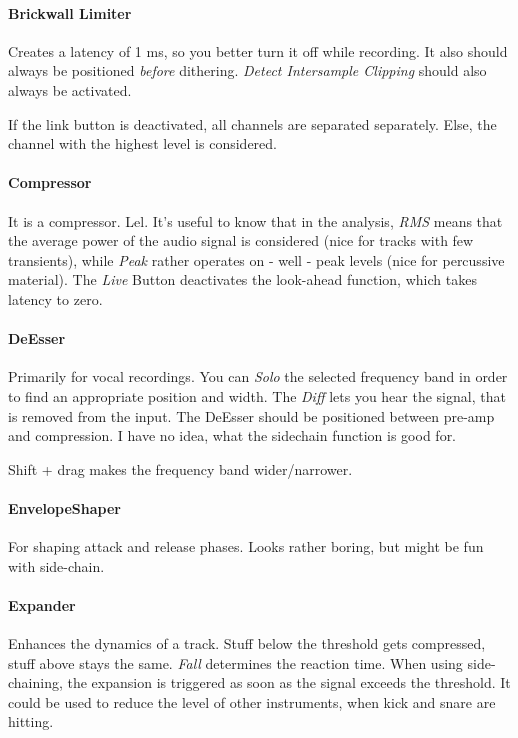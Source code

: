 \documentclass[10pt]{article}
\begin{document}
\paragraph{Brickwall Limiter} Creates a latency of 1 ms, so you better turn it off while recording. It also should always be positioned \textit{before} dithering. \textit{Detect Intersample Clipping} should also always be activated.

If the link button is deactivated, all channels are separated separately. Else, the channel with the highest level is considered.

\paragraph{Compressor} It is a compressor. Lel. It's useful to know that in the analysis, \textit{RMS} means that the average power of the audio signal is considered (nice for tracks with few transients), while \textit{Peak} rather operates on - well - peak levels (nice for percussive material). The \textit{Live} Button deactivates the look-ahead function, which takes latency to zero.

\paragraph{DeEsser} Primarily for vocal recordings. You can \textit{Solo} the selected frequency band in order to find an appropriate position and width. The \textit{Diff} lets you hear the signal, that is removed from the input. The DeEsser should be positioned between pre-amp and compression. I have no idea, what the sidechain function is good for.

Shift + drag makes the frequency band wider/narrower.

\paragraph{EnvelopeShaper} For shaping attack and release phases. Looks rather boring, but might be fun with side-chain.

\paragraph{Expander} Enhances the dynamics of a track. Stuff below the threshold gets compressed, stuff above stays the same. \textit{Fall} determines the reaction time. When using side-chaining, the expansion is triggered as soon as the signal exceeds the threshold. It could be used to reduce the level of other instruments, when kick and snare are hitting.
\end{document}
